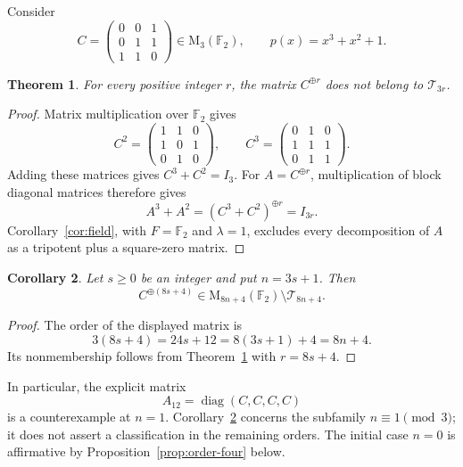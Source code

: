 \documentclass[12pt]{amsart}
\newtheorem{theorem}{Theorem}[section]
\newtheorem{corollary}[theorem]{Corollary}
\theoremstyle{remark}
\numberwithin{equation}{section}
\theoremstyle{definition}
\newcommand{\F}{\mathbb F}
\newcommand{\Mat}{\mathrm M}
\newcommand{\Id}{I}
\newcommand{\TS}{\mathcal T}
\DeclareMathOperator{\diag}{diag}
\begin{document}
Consider
\begin{equation}\label{eq:C}
 C=\begin{pmatrix}
 0&0&1\\
 0&1&1\\
 1&1&0
 \end{pmatrix}\in\Mat_3(\F_2),
 \qquad p(x)=x^3+x^2+1.
\end{equation}

\begin{theorem}\label{thm:family}
For every positive integer $r$, the matrix $C^{\oplus r}$ does not belong to $\TS_{3r}$.
\end{theorem}

\begin{proof}
Matrix multiplication over $\F_2$ gives
\[
 C^2=\begin{pmatrix}
 1&1&0\\
 1&0&1\\
 0&1&0
 \end{pmatrix},\qquad
 C^3=\begin{pmatrix}
 0&1&0\\
 1&1&1\\
 0&1&1
 \end{pmatrix}.
\]
Adding these matrices gives $C^3+C^2=\Id_3$. For $A=C^{\oplus r}$, multiplication of block diagonal matrices therefore gives
\[
 A^3+A^2=(C^3+C^2)^{\oplus r}=\Id_{3r}.
\]
Corollary~\ref{cor:field}, with $F=\F_2$ and $\lambda=1$, excludes every decomposition of $A$ as a tripotent plus a square-zero matrix.
\end{proof}

\begin{corollary}\label{cor:conjecture}
Let $s\geq0$ be an integer and put $n=3s+1$. Then
\[
 C^{\oplus(8s+4)}\in\Mat_{8n+4}(\F_2)\setminus\TS_{8n+4}.
\]
\end{corollary}

\begin{proof}
The order of the displayed matrix is
\[
 3(8s+4)=24s+12=8(3s+1)+4=8n+4.
\]
Its nonmembership follows from Theorem~\ref{thm:family} with $r=8s+4$.
\end{proof}

In particular, the explicit matrix
\begin{equation}
 A_{12}=\diag(C,C,C,C)
\end{equation}
is a counterexample at $n=1$. Corollary~\ref{cor:conjecture} concerns the subfamily $n\equiv1\pmod3$; it does not assert a classification in the remaining orders. The initial case $n=0$ is affirmative by Proposition~\ref{prop:order-four} below.
\end{document}
